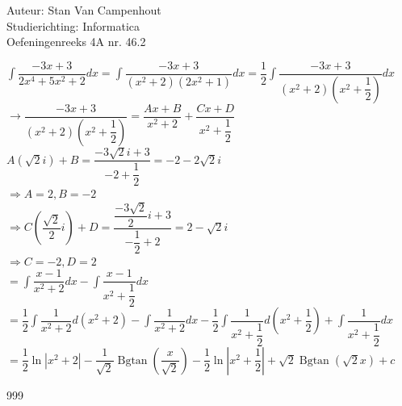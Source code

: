 \documentclass[a4paper]{article}
\begin{document}
  
\noindent \large Auteur: Stan Van Campenhout \\
\noindent \large Studierichting:  Informatica\\
\noindent \large Oefeningenreeks 4A nr. 46.2\\

\medskip

\normalsize

$ \displaystyle\int\dfrac{-3x + 3}{2x^4+5x^2+2}dx = \displaystyle\int\dfrac{-3x+3}{\left(x^2+2\right)\left(2x^2+1\right)}dx
= \dfrac{1}{2}\displaystyle\int\dfrac{-3x+3}{\left(x^2+2\right)\left(x^2+\dfrac{1}{2}\right)}dx $\\

$ \rightarrow \dfrac{-3x+3}{\left(x^2+2\right)\left(x^2+\dfrac{1}{2}\right)} = \dfrac{Ax + B}{x^2+2} + \dfrac{Cx + D}{x^2 + \dfrac{1}{2}} $\\

$ A\left(\sqrt{2}i\right) + B = \dfrac{-3\sqrt{2}i + 3}{-2 + \dfrac{1}{2}} = -2 -2\sqrt{2}i $\\

$ \Rightarrow A = 2, B = -2 $\\

$ \Rightarrow C\left(\dfrac{\sqrt{2}}{2}i\right) + D = \dfrac{\dfrac{-3\sqrt{2}}{2}i + 3}{-\dfrac{1}{2}+2} = 2 - \sqrt{2}i $\\

$ \Rightarrow C = -2, D = 2 $\\

$ = \displaystyle\int\dfrac{x-1}{x^2+2}dx - \displaystyle\int\dfrac{x-1}{x^2+\dfrac{1}{2}}dx $\\

$ = \dfrac{1}{2}\displaystyle\int\dfrac{1}{x^2+2}d\left(x^2+2\right) - \displaystyle\int\dfrac{1}{x^2+2}dx -\dfrac{1}{2}\displaystyle\int\dfrac{1}{x^2+\dfrac{1}{2}}d\left(x^2+\dfrac{1}{2}\right) + \displaystyle\int\dfrac{1}{x^2+\dfrac{1}{2}}dx $\\

$ = \dfrac{1}{2}\ln|x^2+2|-\dfrac{1}{\sqrt{2}}\operatorname{Bgtan}\left(\dfrac{x}{\sqrt{2}}\right)-\dfrac{1}{2}\ln\left|x^2+\dfrac{1}{2}\right|+\sqrt{2}\operatorname{Bgtan}\left(\sqrt{2}x\right) + c $\\

\begin{thebibliography}{999}
\end{thebibliography}
\end{document}
